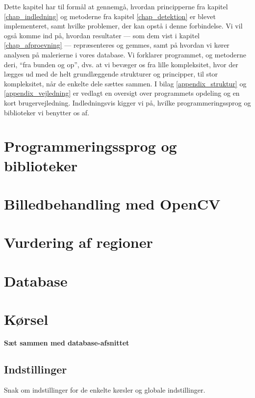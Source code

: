 {
{\sffamily Dette kapitel har til formål at gennemgå, hvordan
principperne fra kapitel \ref{chap_indledning} og metoderne fra kapitel
\ref{chap_detektion} er blevet implementeret, samt hvilke problemer, der
kan opstå i denne forbindelse. Vi vil også komme ind på, hvordan
resultater --- som dem vist i kapitel \ref{chap_afproevning} ---
repræsenteres og gemmes, samt på hvordan vi kører analysen på malerierne
i vores database.  Vi forklarer programmet, og metoderne deri, ``fra
bunden og op'', dvs. at vi bevæger os fra lille kompleksitet, hvor der
lægges ud med de helt grundlæggende strukturer og principper, til stor
kompleksitet, når de enkelte dele sættes sammen.  I bilag
\ref{appendix_struktur} og \ref{appendix_vejledning} er vedlagt en
oversigt over programmets opdeling og en kort brugervejledning.
Indledningsvis kigger vi på, hvilke programmeringssprog og biblioteker
vi benytter os af.
}

\section{Programmeringssprog og biblioteker\label{section_programmeringssprog}}


\section{Billedbehandling med OpenCV\label{section_impBilledbehandling}}


\section{Vurdering af regioner\label{section_vurdering_regioner}}


\section{Database\label{section_imp_database}}


\section{Kørsel\label{section_koersel}}
\textbf{Sæt sammen med database-afsnittet}\\

\subsection{Indstillinger}
Snak om indstillinger for de enkelte kørsler og globale indstillinger.

}

